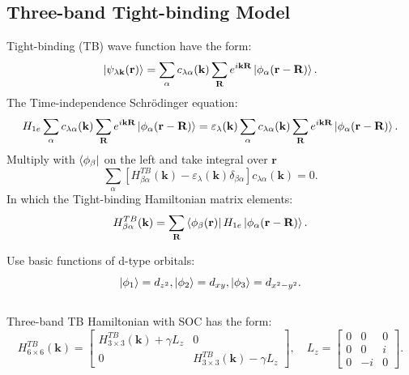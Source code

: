 \documentclass{beamer}
\begin{document}
	\subsection{Three-band Tight-binding Model}
	\begin{frame}
		Tight-binding (TB) wave function have the form:
		\begin{equation}
			\ket{\psi_{\lambda \textbf{k}}(\textbf{r})} = \sum_{\alpha} c_{\lambda \alpha} (\textbf{k}) \sum_{\textbf{R}} e^{i\textbf{k}\textbf{R}} \ket{\phi_{\alpha}(\textbf{r}-\textbf{R})}.
		\end{equation}
		The Time-independence Schrödinger equation:
		\begin{equation*}
			H_{1e} \sum_{\alpha} c_{\lambda \alpha} (\textbf{k}) \sum_{\textbf{R}} e^{i\textbf{k}\textbf{R}} \ket{\phi_{\alpha}(\textbf{r}-\textbf{R})} = \varepsilon_{\lambda} (\textbf{k}) \sum_{\alpha} c_{\lambda \alpha} (\textbf{k}) \sum_{\textbf{R}} e^{i\textbf{k}\textbf{R}} \ket{\phi_{\alpha}(\textbf{r}-\textbf{R})}.
		\end{equation*}
		Multiply with $\bra{\phi_{\beta}}$ on the left and take integral over $\textbf{r}$
		\begin{equation}
			\sum_{\alpha} [H^{TB}_{\beta \alpha}(\textbf{k}) - \varepsilon_{\lambda}(\textbf{k})\delta_{\beta\alpha}]c_{\lambda \alpha}(\textbf{k}) = 0.
		\end{equation}
		In which the Tight-binding Hamiltonian matrix elements:
		\begin{equation}
			H^{TB}_{\beta \alpha}(\textbf{k}) = \sum_{\textbf{R}} \bra{\phi_{\beta} (\textbf{r})} H_{1e}\ket{\phi_{\alpha}(\textbf{r}-\textbf{R})}.
		\end{equation}
	\end{frame}
	\begin{frame}
Use basic functions of d-type orbitals: $$\ket{\phi_1} = d_{z^2}, \ket{\phi_2} = d_{xy}, \ket{\phi_3} = d_{x^2- y^2}.$$\\Three-band TB Hamiltonian with SOC has the form:
		\begin{equation*}
			H^{TB}_{6\times 6}(\textbf{k}) = \begin{bmatrix}
				H^{TB}_{3\times 3}(\textbf{k}) + \gamma L_z & 0\\ 0& H^{TB}_{3\times 3}(\textbf{k}) - \gamma L_z
			\end{bmatrix}, \quad L_z= \begin{bmatrix}
			0 & 0 & 0\\
			0 & 0 & i\\
			0 & -i& 0
			\end{bmatrix}.
		\end{equation*}
	\end{frame}
\end{document}
